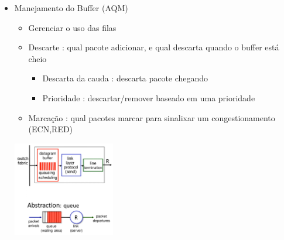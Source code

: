 \begin{itemize}[left=0.5cm, align=left, nosep]
\begin{itemize}[left=0.5cm, nosep, label=$\hookrightarrow$]
\begin{itemize}[left=0.5cm, nosep, label=$-$]
                        \end{itemize}
                
                    \end{itemize}
                
                \item Manejamento do Buffer (AQM)
                    \begin{itemize}[left=0.5cm, nosep, label=$\hookrightarrow$]
                        \item Gerenciar o uso das filas
                        \item Descarte : qual pacote adicionar, e qual descarta quando o buffer está cheio
                            \begin{itemize}[left=0.5cm, nosep, label=$-$]
                                \item Descarta da cauda : descarta pacote chegando
                                \item Prioridade : descartar/remover baseado em uma prioridade 
                            \end{itemize}    
                    
                        \item Marcação : qual pacotes marcar para sinalixar um congestionamento (ECN,RED)

                    \end{itemize} 
                    
                    \begin{center}
                        \includegraphics[width=0.35\textwidth]{img/cap-04/manejamento-buffer.png}
                    \end{center}
               
            \end{itemize}
            
